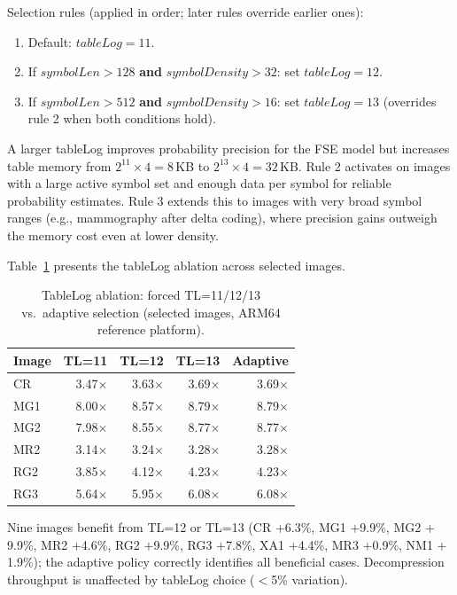 \documentclass[journal]{IEEEtran}
\begin{document}
Selection rules (applied in order; later rules override earlier ones):
\begin{enumerate}
  \item Default: $\textit{tableLog} = 11$.
  \item If $\textit{symbolLen} > 128$ \textbf{and} $\textit{symbolDensity} > 32$:
  set $\textit{tableLog} = 12$.
  \item If $\textit{symbolLen} > 512$ \textbf{and} $\textit{symbolDensity} > 16$:
  set $\textit{tableLog} = 13$ (overrides rule 2 when both conditions hold).
\end{enumerate}

A larger tableLog improves probability precision for the FSE model but
increases table memory from $2^{11} \times 4 = 8$\,KB to $2^{13} \times 4 =
32$\,KB. Rule 2 activates on images with a large active symbol set and enough
data per symbol for reliable probability estimates. Rule 3 extends this to
images with very broad symbol ranges (e.g., mammography after delta coding),
where precision gains outweigh the memory cost even at lower density.

Table~\ref{tab:tablelog-ablation} presents the tableLog ablation across
selected images.

\begin{table}[htbp]
\centering
\caption{TableLog ablation: forced TL=11/12/13 vs.\ adaptive selection
(selected images, ARM64 reference platform).}
\label{tab:tablelog-ablation}
\scriptsize
\begin{tabular}{lrrrr}
\toprule
Image & TL=11 & TL=12 & TL=13 & Adaptive \\
\midrule
CR  & 3.47$\times$ & 3.63$\times$ & 3.69$\times$ & 3.69$\times$ \\
MG1 & 8.00$\times$ & 8.57$\times$ & 8.79$\times$ & 8.79$\times$ \\
MG2 & 7.98$\times$ & 8.55$\times$ & 8.77$\times$ & 8.77$\times$ \\
MR2 & 3.14$\times$ & 3.24$\times$ & 3.28$\times$ & 3.28$\times$ \\
RG2 & 3.85$\times$ & 4.12$\times$ & 4.23$\times$ & 4.23$\times$ \\
RG3 & 5.64$\times$ & 5.95$\times$ & 6.08$\times$ & 6.08$\times$ \\
\bottomrule
\end{tabular}
\end{table}

Nine images benefit from TL=12 or TL=13 (CR $+$6.3\%, MG1 $+$9.9\%, MG2
$+$9.9\%, MR2 $+$4.6\%, RG2 $+$9.9\%, RG3 $+$7.8\%, XA1 $+$4.4\%, MR3
$+$0.9\%, NM1 $+$1.9\%); the adaptive policy correctly identifies all
beneficial cases. Decompression throughput is unaffected by tableLog choice
($<$5\% variation).
\end{document}
